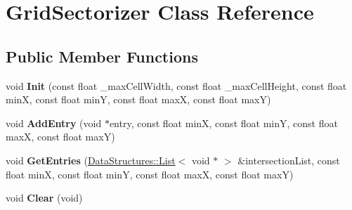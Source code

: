 \hypertarget{class_grid_sectorizer}{\section{Grid\-Sectorizer Class Reference}
\label{class_grid_sectorizer}
}
\subsection*{Public Member Functions}
\begin{DoxyCompactItemize}
\item 
\hypertarget{class_grid_sectorizer_a2cb619ad8bafe27b9dd9a288af906342}{void {\bfseries Init} (const float \-\_\-max\-Cell\-Width, const float \-\_\-max\-Cell\-Height, const float min\-X, const float min\-Y, const float max\-X, const float max\-Y)}\label{class_grid_sectorizer_a2cb619ad8bafe27b9dd9a288af906342}

\item 
\hypertarget{class_grid_sectorizer_a17cadf0a52cfd5ca90a10f7a387f29f7}{void {\bfseries Add\-Entry} (void $\ast$entry, const float min\-X, const float min\-Y, const float max\-X, const float max\-Y)}\label{class_grid_sectorizer_a17cadf0a52cfd5ca90a10f7a387f29f7}

\item 
\hypertarget{class_grid_sectorizer_a32087f59eb29d179b8d456afd7f85ce7}{void {\bfseries Get\-Entries} (\hyperlink{class_data_structures_1_1_list}{Data\-Structures\-::\-List}$<$ void $\ast$ $>$ \&intersection\-List, const float min\-X, const float min\-Y, const float max\-X, const float max\-Y)}\label{class_grid_sectorizer_a32087f59eb29d179b8d456afd7f85ce7}

\item 
\hypertarget{class_grid_sectorizer_a4e38b3a7ef50b2256203629a4f60477f}{void {\bfseries Clear} (void)}\label{class_grid_sectorizer_a4e38b3a7ef50b2256203629a4f60477f}

\end{DoxyCompactItemize}
